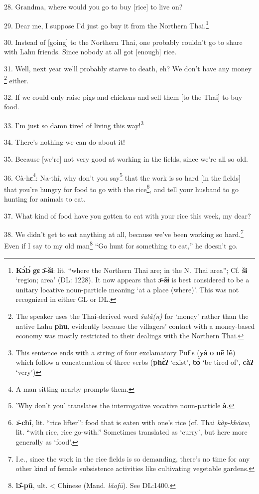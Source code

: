 28. Grandma, where would you go to buy [rice] to live on?

29. Dear me, I suppose I'd just go buy it from the Northern Thai.\footnote{\textbf{Kɔ́lɔ́} \textbf{gɛ} \textbf{ɔ̄-šɨ}: lit. ``where the Northern Thai are; in the N. Thai area''; Cf. \textbf{šɨ} `region; area' (DL: 1228). It now appears that \textbf{ɔ̄-šɨ} is best considered to be a unitary locative noun-particle meaning `at a place (where)'. This was not recognized in either GL or DL.}

30. Instead of [going] to the Northern Thai, one probably couldn't go to share
with Lahu friends. Since nobody at all got [enough] rice.

31. Well, next year we'll probably starve to death, eh? We don't have any money
\footnote{The speaker uses the Thai-derived word \textit{šatâ(n)} for `money' rather than the native Lahu \textbf{phu}, evidently because the villagers' contact with a money-based economy was mostly restricted to their dealings with the Northern Thai.} either.

32. If we could only raise pigs and chickens and sell them [to the Thai] to buy
food.

33. I'm just so damn tired of living this way!\footnote{This sentence ends with a string of four exclamatory Puf's (\textbf{yâ} \textbf{o} \textbf{nē} \textbf{lê}) which follow a concatenation of three verbs (\textbf{phɛ̀ʔ} `exist', \textbf{bɔ̀} `be tired of', \textbf{càʔ} `very')}

34. There's nothing we can do about it!

35. Because [we're] not very good at working in the fields, since we're all so
old.


36. Cà-hɛ\footnote{A man sitting nearby prompts them.}: Na-thî, why don't you say\footnote{'Why don't you' translates the interrogative vocative noun-particle \textbf{à}.} that the work is so hard [in
the fields] that you're hungry for food to go with the rice\footnote{\textbf{ɔ̄-chî}, lit. ``rice lifter'': food that is eaten with one's rice (cf. Thai \textit{kàp-khâaw}, lit. ``with rice, rice go-with.'' Sometimes translated as `curry', but here more generally as `food'.}, and tell your
husband to go hunting for animals to eat.

37. What kind of food have you gotten to eat with your rice this week, my dear?

38. We didn't get to eat anything at all, because we've been working so hard.\footnote{I.e., since the work in the rice fields is so demanding, there's no time for any other kind of female subsistence activities like cultivating vegetable gardens.}
Even if I say to my old man\footnote{\textbf{lɔ̂-pū}, ult. < Chinese  (Mand. \textit{lăofū}). See DL:1400.} ``Go hunt for something to eat,'' he doesn't go.

